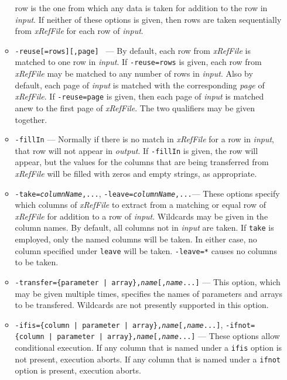 \begin{itemize}
\begin{itemize}
        row is the one from which any data is taken for addition to the row in {\em input}. If
        neither of these options is given, then rows are taken sequentially from {\em xRefFile}
        for each row of {\em input}.
    \item {\tt -reuse[=rows][,page] } --- By default, each row from {\em xRefFile} is matched to one row in {\em input}.
        If {\tt -reuse=rows} is given, each row from {\em xRefFile} may be matched to any number of
        rows in {\em input}.  Also by default, each page of {\em input} is matched with the corresponding
        {\em page} of {\em xRefFile}.  If {\tt -reuse=page} is given, then each page of {\em input} is
        matched anew to the first page of {\em xRefFile}.  The two qualifiers may be given together.
    \item {\tt -fillIn} --- Normally if there is no match in {\em xRefFile} for a row in {\em input},
        that row will not appear in {\em output}.  If {\tt -fillIn} is given, the row will appear,
        but the values for the columns that are being transferred from {\em xRefFile} will be filled
        with zeros and empty strings, as appropriate.
    \item {\tt -take={\em columnName},...}, {\tt -leave={\em columnName},...}--- 
        These options specify which columns of {\em xRefFile} to extract from
        a matching or equal row of {\em xRefFile}
        for addition to a row of {\em input}.  Wildcards may be given in the column names.
        By default, all columns not in {\em input}
        are taken.  If \verb|take| is employed, only the named columns will be taken.  In either case, no
        column specified under \verb|leave| will be taken.  \verb|-leave=*| causes no columns to be
        taken.
    \item {\tt -transfer=\{parameter | array\},{\em name}[,{\em name}...]} --- 
        This option, which may be given multiple times, specifies the names of
        parameters and arrays to be transfered.  Wildcards are not presently supported in this option.
    \item {\tt -ifis=\{column | parameter | array\},{\em name}[,{\em name}...]}, 
        {\tt -ifnot=\{column | parameter | array\},{\em name}[,{\em name}...]} 
        --- These options allow conditional execution.  If any column that is named under
       a \verb|ifis| option is not present, execution aborts.   If any column that is named under 
       a \verb|ifnot| option is present, execution aborts.
    \end{itemize}

\end{itemize}
